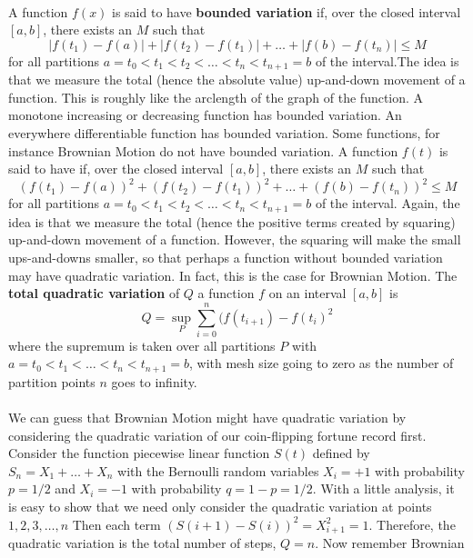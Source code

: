 \begin{problem}
  \\
  A function $f(x)$ is said to have \textbf{bounded variation} if, over the closed
  interval $[a,b]$, there exists an $M$ such that
  \[
    | f(t_1) - f(a)| + |f(t_2) - f(t_1)| + \ldots + |f(b) - f(t_n)| \le M
  \]
  \ni  for all partitions $a = t_0 < t_1 < t_2 < \ldots < t_n < t_{n+1} = b$
  of the interval.The idea is that we measure the total (hence the absolute value)
  up-and-down movement of a function.  This is roughly like the arclength of the
  graph of the function.  A monotone increasing or decreasing function has bounded
  variation.  An everywhere differentiable function has bounded variation.
  Some functions, for instance Brownian Motion do not have bounded variation. A function
  $f(t)$ is said to have  if, over the closed interval $[a,b]$,
  there exists an $M$ such that
  \[
    (f(t_1) - f(a))^2 + (f(t_2) - f(t_1))^2 + \ldots + (f(b) - f(t_n))^2\le M
  \]
  \ni for all partitions $a=t_0<t_1<t_2<\ldots < t_n < t_{n+1} = b$ of the interval.
  Again, the idea is that we measure the total (hence the positive terms
  created by squaring) up-and-down movement of a function.  However, the squaring will
  make the small ups-and-downs smaller, so that perhaps a function without
  bounded variation may have quadratic variation.  In fact, this is the
  case for Brownian Motion. The \textbf{total quadratic variation} of $Q$ a function
  $f$ on an interval $[a,b]$ is
  \[
    Q = \sup_{P} \sum_{i=0}^{n} (f(t_{i+1}) - f(t_{i})^2
  \]
  where the supremum is taken over all partitions $P$ with
  $ a = t_0 < t _1 < \ldots < t_n < t_{n+1} = b$, with mesh size
  going to zero as the number of partition points $n$ goes to infinity. \\
  \ni{} \\
  \ni We can guess that Brownian Motion might have quadratic variation by
  considering the quadratic variation of our coin-flipping fortune record
  first.  Consider the function piecewise linear function $S(t)$
  defined by $S_n = X_1 + \ldots + X_n$ with the Bernoulli random variables
  $X_i = +1$ with probability $p = 1/2$ and $X_i = -1$ with probability
  $q = 1-p = 1/2$. With a little analysis, it is easy to show that we need
  only consider the quadratic variation at points $1,2,3, \ldots, n$
  Then each term $(S(i+1) - S(i))^2 = X_{i+1}^2 = 1$.  Therefore, the
  quadratic variation is the total number of steps, $Q=n$. Now remember Brownian

\end{problem}
